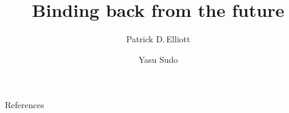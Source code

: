 \documentclass{beamer}
\title{Binding \alert{back from the future}}
\author{Patrick D.\,Elliott
 \and
Yasu Sudo}
\institute{Asymmetries in language: presuppositions and beyond, ZAS Berlin}
\begin{document}
\begin{frame}
  \maketitle
\end{frame}

\begin{frame}

\end{frame}

\begin{frame}[allowframebreaks]{References}

  \printbibliography[heading=none]

\end{frame}
\end{document}
